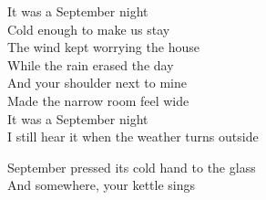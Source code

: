 \begin{lyrics}
It was a September night\\
Cold enough to make us stay\\
The wind kept worrying the house\\
While the rain erased the day\\
And your shoulder next to mine\\
Made the narrow room feel wide\\
It was a September night\\
I still hear it when the weather turns outside

September pressed its cold hand to the glass\\
And somewhere, your kettle sings
\end{lyrics}

